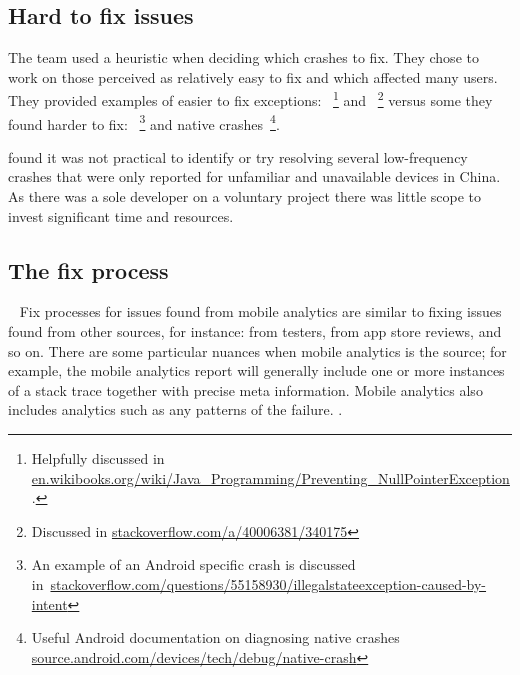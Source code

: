 \subsection{Hard to fix issues}
The  team used a heuristic when deciding which crashes to fix. They chose to work on those perceived as relatively easy to fix and which affected many users. They provided examples of easier to fix exceptions: ~\footnote{Helpfully discussed in \href{https://en.wikibooks.org/wiki/Java\_Programming/Preventing\_NullPointerException}{en.wikibooks.org/wiki/Java\_Programming/Preventing\_NullPointerException}.} and ~\footnote{Discussed in \href{https://stackoverflow.com/a/40006381/340175}{stackoverflow.com/a/40006381/340175}} versus some they found harder to fix: ~\footnote{An example of an Android specific crash is discussed in~\href{https://stackoverflow.com/questions/55158930/illegalstateexception-caused-by-intent}{stackoverflow.com/questions/55158930/illegalstateexception-caused-by-intent}} and native crashes~\footnote{Useful Android documentation on diagnosing native crashes \href{https://source.android.com/devices/tech/debug/native-crash}{source.android.com/devices/tech/debug/native-crash}}.

 found it was not practical to identify or try resolving several low-frequency crashes that were only reported for unfamiliar and unavailable devices in China. As there was a sole developer on a voluntary project there was little scope to invest significant time and resources.

\subsection{The fix process}~\label{aiu-the-fix-process-topic}
Fix processes for issues found from mobile analytics are similar to fixing issues found from other sources, for instance: from testers, from app store reviews, and so on. There are some particular nuances when mobile analytics is the source; for example, the mobile analytics report will generally include one or more instances of a stack trace together with precise meta information. Mobile analytics also includes analytics such as any patterns of the failure. . 

